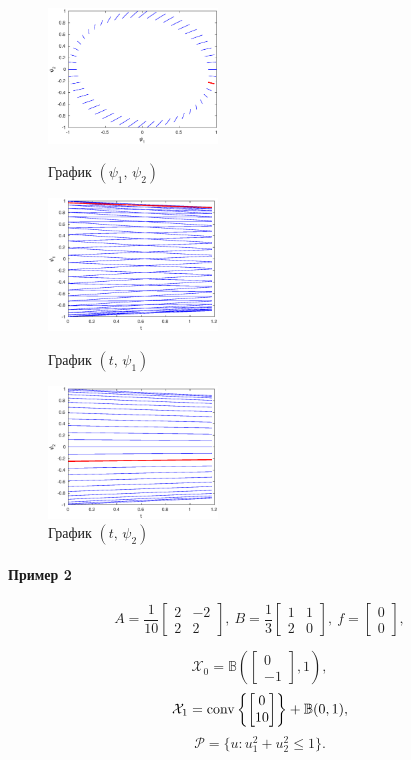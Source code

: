 \documentclass[11pt]{article}
\newcommand\PS{\mathcal{P}}
\newcommand\X{\mathcal{X}}
\newcommand\Cl[2]{\begin{bmatrix}
#1 \\ #2
\end{bmatrix}}
\newcommand\Conv[1]{{\rm conv}\left\{ #1 \right\}}
\begin{document}
\begin{figure}[h]
\begin{multicols}{3}
	\hfill
	\includegraphics[width=45mm]{1pp.eps}
	\hfill
	\caption{График $(\psi_1, \, \psi_2)$}
	\hfill
	\includegraphics[width=45mm]{1tp1.eps}
	\hfill
	\caption{График $(t, \, \psi_1)$}
    \hfill
	\includegraphics[width=45mm]{1tp2.eps}
	\hfill
	\caption{График $(t, \, \psi_2)$}
\end{multicols}
\end{figure}		

\newpage
\paragraph{Пример 2\\}
\begin{equation}
A = \frac1{10}\begin{bmatrix}
2 & -2 \\ 2 & 2
\end{bmatrix},\ 
B = \frac13\begin{bmatrix}
1 & 1 \\ 2 & 0
\end{bmatrix}, \
f = \begin{bmatrix}
0 \\ 0
\end{bmatrix},
\end{equation}

$$\X_0 = \mathbb{B}\left(\Cl{0}{-1}, 1\right),$$
$$\X_1 = \Conv{\Cl{0}{10}} + \mathbb{B}(0, 1),$$
$$\PS = \{u\colon u_1^2 + u_2^2 \le 1\}.$$
\end{document}

